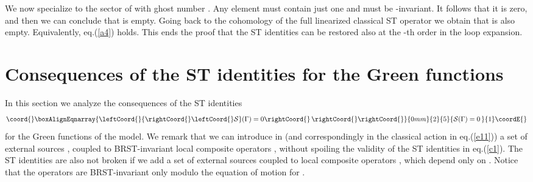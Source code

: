 \documentclass[a4paper,11pt]{article}
\def\G{\Gamma}
\begin{document}
We now specialize to the sector \coordHE{} 
of \coordHE{} with ghost number \coordHE{}.
Any element \coordHE{}
must contain just one \myHighlight{$\omega$}\coordHE{} and must be 
\coordHE{}-invariant. It follows that it is zero, and then 
we can conclude that  \coordHE{}  is empty.
Going back to the cohomology of the full linearized classical ST
operator \coordHE{} we obtain that \coordHE{}
is also empty. Equivalently, eq.(\ref{a4}) holds. 
This ends the proof that the ST identities 
can be restored also at the \coordHE{}-th order
in the loop expansion.

\section{Consequences of the ST identities for the Green functions}\label{sec5}

In this section we analyze the consequences 
 of the ST identities
%
\begin{eqnarray}\coord{}\boxAlignEqnarray{\leftCoord{}
{\rightCoord{}\leftCoord{}\cal S}(\G) =0 \rightCoord{}\, \rightCoord{} 
\label{c1}
\rightCoord{}}{0mm}{2}{5}{
{\cal S}(\G) =0 \,  
}{1}\coordE{}\end{eqnarray}
%
for the Green functions of the model.
We remark that we can introduce in \coordHE{} (and correspondingly in the classical action in eq.(\ref{e11}))
a set of external sources 
\coordHE{}, coupled to BRST-invariant local composite operators
\coordHE{}, without spoiling the validity of the ST identities
in eq.(\ref{c1}).
The ST identities are also not broken  if we add a set of external sources 
\coordHE{} coupled to local composite operators 
\coordHE{}, which depend only on \coordHE{}.
Notice that the operators 
\coordHE{} are BRST-invariant only modulo the equation
of motion for \coordHE{}.
\end{document}
